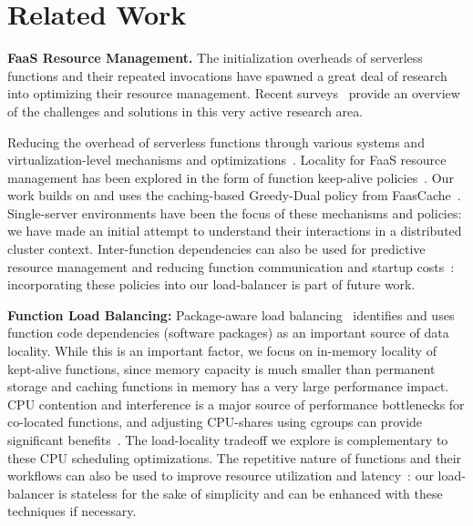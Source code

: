 \section{Related Work}

\noindent \textbf{FaaS Resource Management.}
The initialization overheads of serverless functions and their repeated invocations have spawned a great deal of research into optimizing their resource management.
Recent surveys~\cite{faas-survey-jan-2022, raza2021sok, eismann2020serverless, hassan2021survey, mampage2021holistic} provide an overview of the challenges and solutions in this very active research area. 

Reducing the overhead of serverless functions through various systems and virtualization-level mechanisms and  optimizations~\cite{du2020catalyzer, firecracker-nsdi20, dukic2020photons, akkus_sand_2018, vhive-asplos21, carreira2021warm}. 
%
Locality for FaaS resource management has been explored in the form of function keep-alive policies~\cite{shahrad_serverless_2020}. 
Our work builds on and uses the caching-based Greedy-Dual policy from FaasCache~\cite{faascache-asplos21}. 
%
Single-server environments have been the focus of these mechanisms and policies: we have made an initial attempt to understand their interactions in a distributed cluster context.
%
Inter-function dependencies can also be used for predictive resource management and reducing function communication and startup costs~\cite{gunasekaran2020fifer, daw2021speedo, shen2021defuse}: incorporating these policies into our load-balancer is part of future work. 

\noindent \textbf{Function Load Balancing:}
Package-aware load balancing~\cite{package-cristina-19}  identifies and uses function code dependencies (software packages) as an important source of data locality.
While this is an important factor, we focus on in-memory locality of kept-alive functions, since memory capacity is much smaller than permanent storage and caching functions in memory has a very large performance impact.
%
CPU contention and interference is a major source of performance bottlenecks for co-located functions, and adjusting CPU-shares using cgroups can provide significant benefits~\cite{suresh2019fnsched, suresh2021servermore, ensure-faas-acsos20}.
%
The load-locality tradeoff we explore is complementary to these CPU scheduling optimizations. 
%
The repetitive nature of functions and their workflows can also be used to improve resource utilization and latency~\cite{hunhoff2020proactive, yu2021faasrank, puru_xanadu_20, przybylski2021data}: our load-balancer is stateless for the sake of simplicity and can be enhanced with these techniques if necessary.



